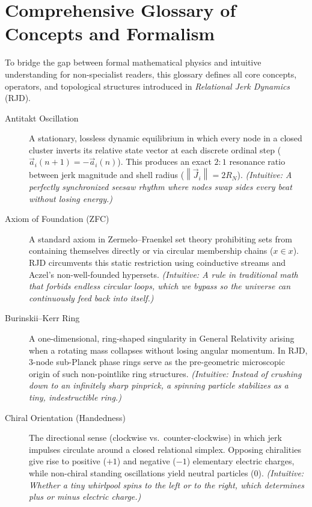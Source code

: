 \documentclass[11pt,a4paper]{article}
\theoremstyle{plain}
\theoremstyle{definition}
\theoremstyle{remark}
\newcommand{\Jerk}{\vec{J}}
\newcommand{\Acc}{\vec{a}}
\newcommand{\norm}[1]{\left\lVert #1 \right\rVert}
\begin{document}
\clearpage

\section{Comprehensive Glossary of Concepts and Formalism}
\label{app:glossary}

To bridge the gap between formal mathematical physics and intuitive understanding for non-specialist readers, this glossary defines all core concepts, operators, and topological structures introduced in \emph{Relational Jerk Dynamics} (RJD).

\begin{description}
    \item[Antitakt Oscillation] A stationary, lossless dynamic equilibrium in which every node in a closed cluster inverts its relative state vector at each discrete ordinal step ($\Acc_i(n+1) = -\Acc_i(n)$). This produces an exact $2:1$ resonance ratio between jerk magnitude and shell radius ($\norm{\Jerk_i} = 2 R_N$). \emph{(Intuitive: A perfectly synchronized seesaw rhythm where nodes swap sides every beat without losing energy.)}

    \item[Axiom of Foundation (ZFC)] A standard axiom in Zermelo--Fraenkel set theory prohibiting sets from containing themselves directly or via circular membership chains ($x \in x$). RJD circumvents this static restriction using coinductive streams and Aczel's non-well-founded hypersets. \emph{(Intuitive: A rule in traditional math that forbids endless circular loops, which we bypass so the universe can continuously feed back into itself.)}

    \item[Burinskii--Kerr Ring] A one-dimensional, ring-shaped singularity in General Relativity arising when a rotating mass collapses without losing angular momentum. In RJD, $3$-node sub-Planck phase rings serve as the pre-geometric microscopic origin of such non-pointlike ring structures. \emph{(Intuitive: Instead of crushing down to an infinitely sharp pinprick, a spinning particle stabilizes as a tiny, indestructible ring.)}

    \item[Chiral Orientation (Handedness)] The directional sense (clockwise vs.\ counter-clockwise) in which jerk impulses circulate around a closed relational simplex. Opposing chiralities give rise to positive ($+1$) and negative ($-1$) elementary electric charges, while non-chiral standing oscillations yield neutral particles ($0$). \emph{(Intuitive: Whether a tiny whirlpool spins to the left or to the right, which determines plus or minus electric charge.)}


\end{description}
\end{document}
